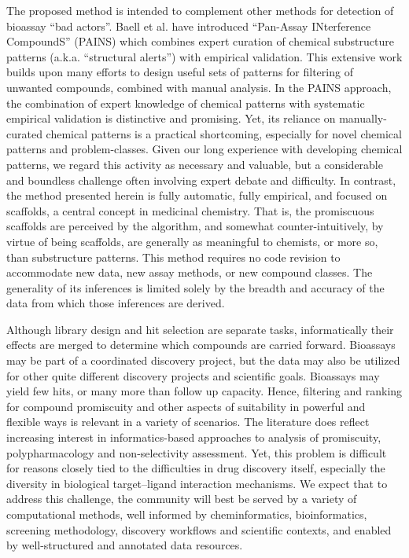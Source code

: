 The proposed method is intended to complement other methods for detection of bioassay “bad actors”. Baell et al. have introduced “Pan-Assay INterference CompoundS” (PAINS) which combines expert curation of chemical substructure patterns (a.k.a. “structural alerts”) with empirical validation. This extensive work builds upon many efforts\cite{Rishton1997-ns,Roche2002-ii,Hann1999-mr,Huth2005-ow} to design useful sets of patterns for filtering of unwanted compounds, combined with manual analysis. In the PAINS approach, the combination of expert knowledge of chemical patterns with systematic empirical validation is distinctive and promising. Yet, its reliance on manually-curated chemical patterns is a practical shortcoming, especially for novel chemical patterns and problem-classes. Given our long experience with developing chemical patterns, we regard this activity as necessary and valuable, but a considerable and boundless challenge often involving expert debate and difficulty. In contrast, the method presented herein is fully automatic, fully empirical, and focused on scaffolds, a central concept in medicinal chemistry. That is, the promiscuous scaffolds are perceived by the algorithm, and somewhat counter-intuitively, by virtue of being scaffolds, are generally as meaningful to chemists, or more so, than substructure patterns. This method requires no code revision to accommodate new data, new assay methods, or new compound classes. The generality of its inferences is limited solely by the breadth and accuracy of the data from which those inferences are derived.

Although library design and hit selection are separate tasks, informatically their effects are merged to determine which compounds are carried forward. Bioassays may be part of a coordinated discovery project, but the data may also be utilized for other quite different discovery projects and scientific goals. Bioassays may yield few hits, or many more than follow up capacity. Hence, filtering and ranking for compound promiscuity and other aspects of suitability in powerful and flexible ways is relevant in a variety of scenarios. The literature does reflect increasing interest in informatics-based approaches to analysis of promiscuity, polypharmacology and non-selectivity assessment\cite{Yang2010-ag,Hu2010-ex,Baell2010-wi}. Yet, this problem is difficult for reasons closely tied to the difficulties in drug discovery itself, especially the diversity in biological target–ligand interaction mechanisms. We expect that to address this challenge, the community will best be served by a variety of computational methods, well informed by cheminformatics, bioinformatics, screening methodology, discovery workflows and scientific contexts, and enabled by well-structured and annotated data resources.

